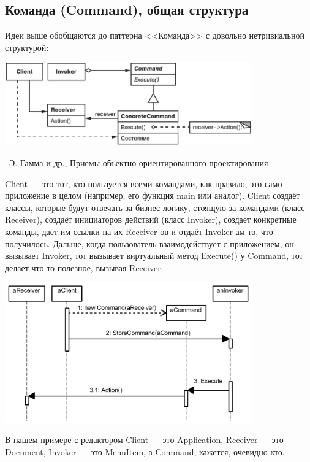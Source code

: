 \documentclass[a5paper]{article}
\newcommand{\attribution}[1] {
    \vspace{-5mm}\begin{flushright}\begin{scriptsize}%
    {\textcopyright\, #1}\end{scriptsize}\end{flushright}
}
\begin{document}
\subsection{Команда (Command), общая структура}

Идеи выше обобщаются до паттерна <<Команда>> с довольно нетривиальной структурой:

\begin{center}
    \includegraphics[width=0.8\textwidth]{command.png}
    \attribution{Э. Гамма и др., Приемы объектно-ориентированного проектирования}
\end{center}

Client --- это тот, кто пользуется всеми командами, как правило, это само приложение в целом (например, его функция main или аналог). Client создаёт классы, которые будут отвечать за бизнес-логику, стоящую за командами (класс Receiver), создаёт инициаторов действий (класс Invoker), создаёт конкретные команды, даёт им ссылки на их Receiver-ов и отдаёт Invoker-ам то, что получилось. Дальше, когда пользователь взаимодействует с приложением, он вызывает Invoker, тот вызывает виртуальный метод Execute() у Command, тот делает что-то полезное, вызывая Receiver:

\begin{center}
    \includegraphics[width=0.8\textwidth]{commandSequence.png}
\end{center}

В нашем примере с редактором Client --- это Application, Receiver --- это Document, Invoker --- это MenuItem, а Command, кажется, очевидно кто.
\end{document}
